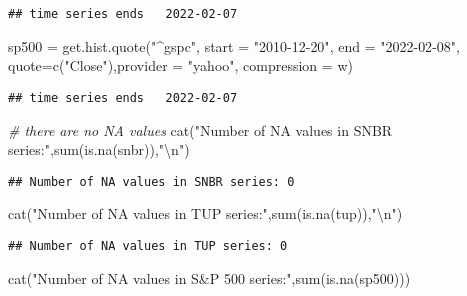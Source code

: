 \documentclass[
  10.5pt,
]{article}
\newenvironment{Shaded}{\begin{snugshade}}{\end{snugshade}}
\newcommand{\AttributeTok}[1]{\textcolor[rgb]{0.77,0.63,0.00}{#1}}
\newcommand{\CommentTok}[1]{\textcolor[rgb]{0.56,0.35,0.01}{\textit{#1}}}
\newcommand{\FunctionTok}[1]{\textcolor[rgb]{0.00,0.00,0.00}{#1}}
\newcommand{\NormalTok}[1]{#1}
\newcommand{\OtherTok}[1]{\textcolor[rgb]{0.56,0.35,0.01}{#1}}
\newcommand{\SpecialCharTok}[1]{\textcolor[rgb]{0.00,0.00,0.00}{#1}}
\newcommand{\StringTok}[1]{\textcolor[rgb]{0.31,0.60,0.02}{#1}}
\begin{document}
\begin{verbatim}
## time series ends   2022-02-07
\end{verbatim}

\begin{Shaded}
\begin{Highlighting}[]
\NormalTok{sp500 }\OtherTok{=} \FunctionTok{get.hist.quote}\NormalTok{(}\StringTok{"\^{}gspc"}\NormalTok{, }\AttributeTok{start =} \StringTok{"2010{-}12{-}20"}\NormalTok{, }\AttributeTok{end =} \StringTok{"2022{-}02{-}08"}\NormalTok{,}
                       \AttributeTok{quote=}\FunctionTok{c}\NormalTok{(}\StringTok{"Close"}\NormalTok{),}\AttributeTok{provider =} \StringTok{"yahoo"}\NormalTok{,}
                     \AttributeTok{compression =} \StringTok{\textquotesingle{}w\textquotesingle{}}\NormalTok{)}
\end{Highlighting}
\end{Shaded}

\begin{verbatim}
## time series ends   2022-02-07
\end{verbatim}

\begin{Shaded}
\begin{Highlighting}[]
\CommentTok{\# there are no NA values }
\FunctionTok{cat}\NormalTok{(}\StringTok{"Number of NA values in SNBR series:"}\NormalTok{,}\FunctionTok{sum}\NormalTok{(}\FunctionTok{is.na}\NormalTok{(snbr)),}\StringTok{"}\SpecialCharTok{\textbackslash{}n}\StringTok{"}\NormalTok{)}
\end{Highlighting}
\end{Shaded}

\begin{verbatim}
## Number of NA values in SNBR series: 0
\end{verbatim}

\begin{Shaded}
\begin{Highlighting}[]
\FunctionTok{cat}\NormalTok{(}\StringTok{"Number of NA values in TUP series:"}\NormalTok{,}\FunctionTok{sum}\NormalTok{(}\FunctionTok{is.na}\NormalTok{(tup)),}\StringTok{"}\SpecialCharTok{\textbackslash{}n}\StringTok{"}\NormalTok{)}
\end{Highlighting}
\end{Shaded}

\begin{verbatim}
## Number of NA values in TUP series: 0
\end{verbatim}

\begin{Shaded}
\begin{Highlighting}[]
\FunctionTok{cat}\NormalTok{(}\StringTok{"Number of NA values in S\&P 500 series:"}\NormalTok{,}\FunctionTok{sum}\NormalTok{(}\FunctionTok{is.na}\NormalTok{(sp500)))}
\end{Highlighting}
\end{Shaded}
\end{document}

